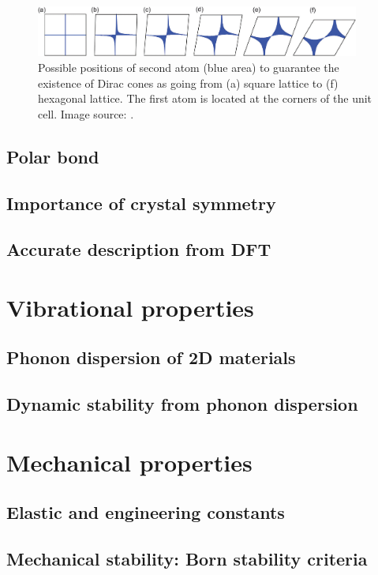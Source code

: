 \begin{figure}[htbp!] 
\centering  
\includegraphics[width=0.95\textwidth]{dirac_hs.png}
\caption{Possible positions of second atom (blue area) to guarantee the existence of Dirac cones as going from (a) square lattice to (f) hexagonal lattice. The first atom is located at the corners of the unit cell. Image source: \cite{Liu2013}. }  
\label{fig:dirac_hs}
\end{figure} 

\subsection{Polar bond}
\subsection{Importance of crystal symmetry}



\subsection{Accurate description from DFT}

\section{Vibrational properties}
\subsection{Phonon dispersion of 2D materials}
\subsection{Dynamic stability from phonon dispersion}

\section{Mechanical properties}
\subsection{Elastic and engineering constants}
\subsection{Mechanical stability: Born stability criteria}